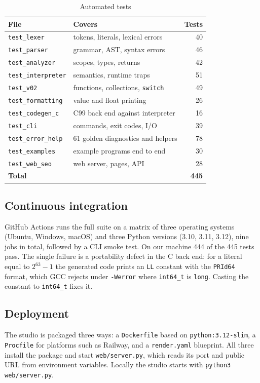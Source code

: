 \documentclass[conference]{IEEEtran}
\begin{document}
\begin{table}[t]
\caption{Automated tests}
\label{tab:tests}
\centering
\footnotesize
\begin{tabular}{@{}l L{4.3cm} r@{}}
\toprule
\textbf{File} & \textbf{Covers} & \textbf{Tests} \\
\midrule
\texttt{test\_lexer} & tokens, literals, lexical errors & 40 \\
\texttt{test\_parser} & grammar, AST, syntax errors & 46 \\
\texttt{test\_analyzer} & scopes, types, returns & 42 \\
\texttt{test\_interpreter} & semantics, runtime traps & 51 \\
\texttt{test\_v02} & functions, collections, \texttt{switch} & 49 \\
\texttt{test\_formatting} & value and float printing & 26 \\
\texttt{test\_codegen\_c} & C99 back end against interpreter & 16 \\
\texttt{test\_cli} & commands, exit codes, I/O & 39 \\
\texttt{test\_error\_help} & 61 golden diagnostics and helpers & 78 \\
\texttt{test\_examples} & example programs end to end & 30 \\
\texttt{test\_web\_seo} & web server, pages, API & 28 \\
\midrule
\textbf{Total} & & \textbf{445} \\
\bottomrule
\end{tabular}
\end{table}

\subsection{Continuous integration}
GitHub Actions runs the full suite on a matrix of three operating systems (Ubuntu, Windows, macOS) and
three Python versions (3.10, 3.11, 3.12), nine jobs in total, followed by a CLI smoke test. On our
machine 444 of the 445 tests pass. The single failure is a portability defect in the C back end: for a
literal equal to $2^{63}-1$ the generated code prints an \texttt{LL} constant with the \texttt{PRId64}
format, which GCC rejects under \texttt{-Werror} where \texttt{int64\_t} is \texttt{long}. Casting the
constant to \texttt{int64\_t} fixes it.

\subsection{Deployment}
The studio is packaged three ways: a \texttt{Dockerfile} based on \texttt{python:3.12-slim}, a
\texttt{Procfile} for platforms such as Railway, and a \texttt{render.yaml} blueprint. All three install the
package and start \texttt{web/server.py}, which reads its port and public URL from environment variables.
Locally the studio starts with \texttt{python3 web/server.py}.
\end{document}
